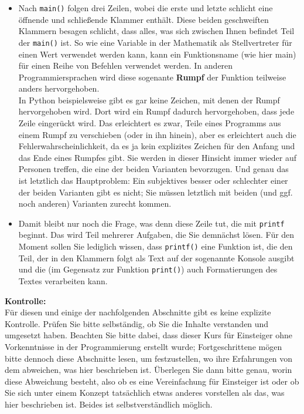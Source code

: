 \begin{itemize}
	\item Nach \verb|main()| folgen drei Zeilen, wobei die erste und letzte schlicht eine öffnende und schließende Klammer enthält. Diese beiden geschweiften Klammern besagen schlicht, dass alles, was sich zwischen Ihnen befindet Teil der \verb|main()| ist. So wie eine Variable in der Mathematik als Stellvertreter für einen Wert verwendet werden kann, kann ein Funktionsname (wie hier main) für einen Reihe von Befehlen verwendet werden. In anderen Programmiersprachen wird diese sogenante \textbf{Rumpf} der Funktion teilweise anders hervorgehoben.\\
	
	In Python beispielsweise gibt es gar keine Zeichen, mit denen der Rumpf hervorgehoben wird. Dort wird ein Rumpf dadurch hervorgehoben, dass jede Zeile eingerückt wird. Das erleichtert es zwar, Teile eines Programms aus einem Rumpf zu verschieben (oder in ihn hinein), aber es erleichtert auch die Fehlerwahrscheinlichkeit, da es ja kein explizites Zeichen für den Anfang und das Ende eines Rumpfes gibt. Sie werden in dieser Hinsicht immer wieder auf Personen treffen, die eine der beiden Varianten bevorzugen. Und genau das ist letztlich das Hauptproblem: Ein subjektives besser oder schlechter einer der beiden Varianten gibt es nicht; Sie müssen letztlich mit beiden (und ggf. noch anderen) Varianten zurecht kommen.
	
	\item Damit bleibt nur noch die Frage, was denn diese Zeile tut, die mit \verb|printf| beginnt. Das wird Teil mehrerer Aufgaben, die Sie demnächst lösen. Für den Moment sollen Sie lediglich wissen, dass \verb|printf()| eine Funktion ist, die den Teil, der in den Klammern folgt als Text auf der sogenannte Konsole ausgibt und die (im Gegensatz zur Funktion \verb|print()|) auch Formatierungen des Textes verarbeiten kann.
\end{itemize}

\textbf{Kontrolle:}\\

Für diesen und einige der nachfolgenden Abschnitte gibt es keine explizite Kontrolle. Prüfen Sie bitte selbständig, ob Sie die Inhalte verstanden und umgesetzt haben. Beachten Sie bitte dabei, dass dieser Kurs für Einsteiger ohne Vorkenntnisse in der Programmierung erstellt wurde; Fortgeschrittene mögen bitte dennoch diese Abschnitte lesen, um festzustellen, wo ihre Erfahrungen von dem abweichen, was hier beschrieben ist. Überlegen Sie dann bitte genau, worin diese Abweichung besteht, also ob es eine Vereinfachung für Einsteiger ist oder ob Sie sich unter einem Konzept tatsächlich etwas anderes vorstellen als das, was hier beschrieben ist. Beides ist selbstverständlich möglich.

